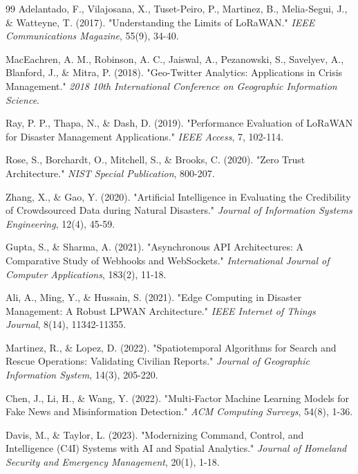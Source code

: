 \documentclass[12pt,a4paper]{report}
\begin{document}
\begin{thebibliography}{99}
Adelantado, F., Vilajosana, X., Tuset-Peiro, P., Martinez, B., Melia-Segui, J., \& Watteyne, T. (2017). "Understanding the Limits of LoRaWAN." \textit{IEEE Communications Magazine}, 55(9), 34-40.

MacEachren, A. M., Robinson, A. C., Jaiswal, A., Pezanowski, S., Savelyev, A., Blanford, J., \& Mitra, P. (2018). "Geo-Twitter Analytics: Applications in Crisis Management." \textit{2018 10th International Conference on Geographic Information Science}.

Ray, P. P., Thapa, N., \& Dash, D. (2019). "Performance Evaluation of LoRaWAN for Disaster Management Applications." \textit{IEEE Access}, 7, 102-114.

Rose, S., Borchardt, O., Mitchell, S., \& Brooks, C. (2020). "Zero Trust Architecture." \textit{NIST Special Publication}, 800-207.

Zhang, X., \& Gao, Y. (2020). "Artificial Intelligence in Evaluating the Credibility of Crowdsourced Data during Natural Disasters." \textit{Journal of Information Systems Engineering}, 12(4), 45-59.

Gupta, S., \& Sharma, A. (2021). "Asynchronous API Architectures: A Comparative Study of Webhooks and WebSockets." \textit{International Journal of Computer Applications}, 183(2), 11-18.

Ali, A., Ming, Y., \& Hussain, S. (2021). "Edge Computing in Disaster Management: A Robust LPWAN Architecture." \textit{IEEE Internet of Things Journal}, 8(14), 11342-11355.

Martinez, R., \& Lopez, D. (2022). "Spatiotemporal Algorithms for Search and Rescue Operations: Validating Civilian Reports." \textit{Journal of Geographic Information System}, 14(3), 205-220.

Chen, J., Li, H., \& Wang, Y. (2022). "Multi-Factor Machine Learning Models for Fake News and Misinformation Detection." \textit{ACM Computing Surveys}, 54(8), 1-36.

Davis, M., \& Taylor, L. (2023). "Modernizing Command, Control, and Intelligence (C4I) Systems with AI and Spatial Analytics." \textit{Journal of Homeland Security and Emergency Management}, 20(1), 1-18.

\end{thebibliography}
\end{document}
